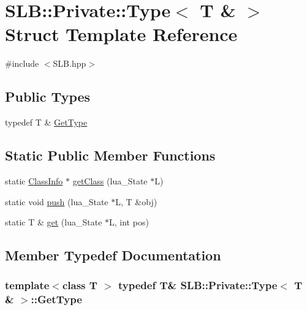 \hypertarget{structSLB_1_1Private_1_1Type_3_01T_01_6_01_4}{}\section{S\+LB\+:\+:Private\+:\+:Type$<$ T \& $>$ Struct Template Reference}
\label{structSLB_1_1Private_1_1Type_3_01T_01_6_01_4}


{\ttfamily \#include $<$S\+L\+B.\+hpp$>$}

\subsection*{Public Types}
\begin{DoxyCompactItemize}
\item 
typedef T \& \hyperlink{structSLB_1_1Private_1_1Type_3_01T_01_6_01_4_aeae50c142ff6d0562612aca4a83ac458}{Get\+Type}
\end{DoxyCompactItemize}
\subsection*{Static Public Member Functions}
\begin{DoxyCompactItemize}
\item 
static \hyperlink{classSLB_1_1ClassInfo}{Class\+Info} $\ast$ \hyperlink{structSLB_1_1Private_1_1Type_3_01T_01_6_01_4_a0c7d27919e9e2c1d501f1b39cdaa9853}{get\+Class} (lua\+\_\+\+State $\ast$L)
\item 
static void \hyperlink{structSLB_1_1Private_1_1Type_3_01T_01_6_01_4_a61cf289a0eda9d9c6e84504f03d59d66}{push} (lua\+\_\+\+State $\ast$L, T \&obj)
\item 
static T \& \hyperlink{structSLB_1_1Private_1_1Type_3_01T_01_6_01_4_a7488c8ec8e84b4468f2e48e03bc1fee1}{get} (lua\+\_\+\+State $\ast$L, int pos)
\end{DoxyCompactItemize}


\subsection{Member Typedef Documentation}
\subsubsection[{\texorpdfstring{Get\+Type}{GetType}}]{\setlength{\rightskip}{0pt plus 5cm}template$<$class T $>$ typedef T\& {\bf S\+L\+B\+::\+Private\+::\+Type}$<$ T \& $>$\+::{\bf Get\+Type}}\hypertarget{structSLB_1_1Private_1_1Type_3_01T_01_6_01_4_aeae50c142ff6d0562612aca4a83ac458}{}\label{structSLB_1_1Private_1_1Type_3_01T_01_6_01_4_aeae50c142ff6d0562612aca4a83ac458}


